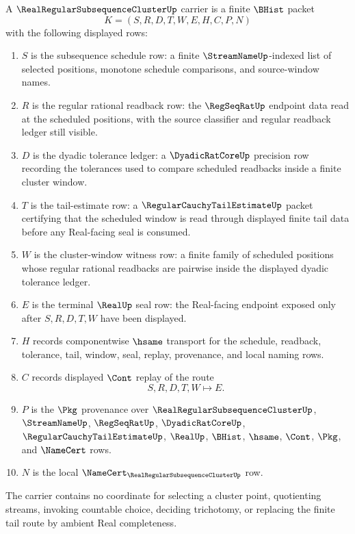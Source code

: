 \begin{definition}
\label{def:real-regular-subsequence-cluster-carrier}
A $\RealRegularSubsequenceClusterUp$ carrier is a finite $\BHist$ packet
$$
K=(S,R,D,T,W,E,H,C,P,N)
$$
with the following displayed rows:
\begin{enumerate}
\item $S$ is the subsequence schedule row: a finite $\StreamNameUp$-indexed list of selected positions, monotone schedule comparisons, and source-window names.
\item $R$ is the regular rational readback row: the $\RegSeqRatUp$ endpoint data read at the scheduled positions, with the source classifier and regular readback ledger still visible.
\item $D$ is the dyadic tolerance ledger: a $\DyadicRatCoreUp$ precision row recording the tolerances used to compare scheduled readbacks inside a finite cluster window.
\item $T$ is the tail-estimate row: a $\RegularCauchyTailEstimateUp$ packet certifying that the scheduled window is read through displayed finite tail data before any Real-facing seal is consumed.
\item $W$ is the cluster-window witness row: a finite family of scheduled positions whose regular rational readbacks are pairwise inside the displayed dyadic tolerance ledger.
\item $E$ is the terminal $\RealUp$ seal row: the Real-facing endpoint exposed only after $S,R,D,T,W$ have been displayed.
\item $H$ records componentwise $\hsame$ transport for the schedule, readback, tolerance, tail, window, seal, replay, provenance, and local naming rows.
\item $C$ records displayed $\Cont$ replay of the route
$$
S,R,D,T,W\longmapsto E .
$$
\item $P$ is the $\Pkg$ provenance over $\RealRegularSubsequenceClusterUp$, $\StreamNameUp$, $\RegSeqRatUp$, $\DyadicRatCoreUp$, $\RegularCauchyTailEstimateUp$, $\RealUp$, $\BHist$, $\hsame$, $\Cont$, $\Pkg$, and $\NameCert$ rows.
\item $N$ is the local $\NameCert_{\RealRegularSubsequenceClusterUp}$ row.
\end{enumerate}
The carrier contains no coordinate for selecting a cluster point, quotienting streams, invoking countable choice, deciding trichotomy, or replacing the finite tail route by ambient Real completeness.
\end{definition}

